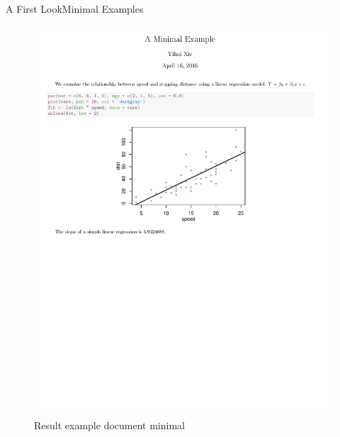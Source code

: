 \documentclass[10pt]{beamer}
\begin{document}
\begin{frame}{A First Look}{Minimal Examples}
	\begin{figure}[H] 
		\begin{flushleft}
			\includegraphics[width=1\textwidth]{./Rnw/minimal}
			\caption{Result example document minimal}
			\label{DCP}
		\end{flushleft}
	\end{figure}
\end{frame}
\end{document}
